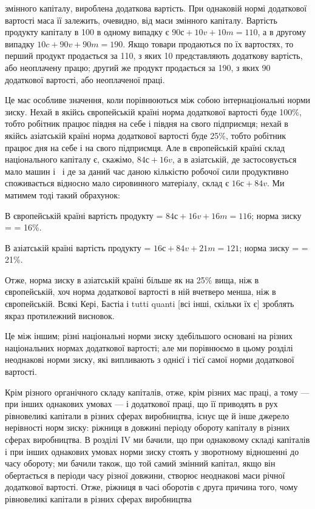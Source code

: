 \parcont{}  %
змінного капіталу, вироблена додаткова вартість. При однаковій
нормі додаткової вартості маса її залежить, очевидно, від маси
змінного капіталу. Вартість продукту капіталу в 100 в одному
випадку є $90 с + 10 v + 10 m = 110$, а в другому випадку $10 c + 90 v + 90 m = 190$. Якщо товари
продаються по їх вартостях,
то перший продукт продається за 110, з яких 10 представляють додаткову вартість, або неоплачену
працю; другий же
продукт продається за 190, з яких 90 додаткової вартості, або
неоплаченої праці.

Це має особливе значення, коли порівнюються між собою
інтернаціональні норми зиску. Нехай в якійсь європейській країні
норма додаткової вартості буде 100\%, тобто робітник працює
півдня на себе і півдня на свого підприємця; нехай в якійсь
азіатській країні норма додаткової вартості буде 25\%, тобто робітник працює  дня на себе і  на
свого підприємця. Але
в європейській країні склад національного капіталу є, скажімо,
$84 с + 16 v$, а в азіатській, де застосовується мало машин і~
і де за даний час даною кількістю робочої сили продуктивно
споживається відносно мало сировинного матеріалу, склад є
$16 с + 84 v$. Ми матимем тоді такий обрахунок:

В європейській країні вартість продукту = $84 с + 16 v + 16 m = 116$; норма зиску =  = 16\%.

В азіатській країні вартість продукту = $16 с + 84 v + 21 m = 121$; норма зиску =  = 21\%.

Отже, норма зиску в азіатській країні більше як на 25\% вища, ніж в європейській, хоч норма
додаткової вартості в ній
вчетверо менша, ніж в європейській. Всякі Кері, Бастіа і tutti quanti [всі інші, скільки їх є]
зроблять якраз протилежний висновок.

Це між іншим; різні національні норми зиску здебільшого
основані на різних національних нормах додаткової вартості;
але ми порівнюємо в цьому розділі неоднакові норми зиску,
які випливають з однієї і тієї самої норми додаткової вартості.

Крім різного органічного складу капіталів, отже, крім різних
мас праці, а тому — при інших однакових умовах — і додаткової
праці, що її приводять в рух рівновеликі капітали в різних сферах
виробництва, існує ще й інше джерело нерівності норм зиску:
ріжниця в довжині періоду обороту капіталу в різних сферах
виробництва. В розділі IV ми бачили, що при однаковому складі
капіталів і при інших однакових умовах норми зиску стоять у зворотному відношенні до часу обороту;
ми бачили також, що
той самий змінний капітал, якщо він обертається в періоди
часу різної довжини, створює неоднакові маси річної додаткової вартості. Отже, ріжниця в часі
оборотів є друга причина
того, чому рівновеликі капітали в різних сферах виробництва
\parbreak{}  %
